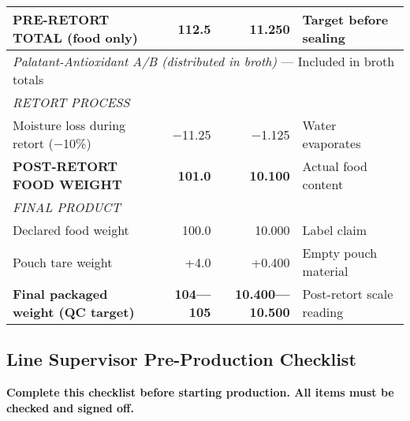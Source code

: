 \begin{table}[h]
\begin{tabular}{@{}lrrl@{}}
\textbf{PRE-RETORT TOTAL (food only)} & \textbf{112.5} & \textbf{11.250} & Target before sealing \\
\midrule
\multicolumn{4}{l}{\textit{Palatant-Antioxidant A/B (distributed in broth)} --- Included in broth totals} \\
\midrule
\multicolumn{4}{l}{\textit{RETORT PROCESS}} \\
Moisture loss during retort ($-$10\%) & $-$11.25 & $-$1.125 & 
Water evaporates \\
\textbf{POST-RETORT FOOD WEIGHT} & \textbf{101.0} & \textbf{10.100} & Actual food content \\
\midrule
\multicolumn{4}{l}{\textit{FINAL PRODUCT}} \\
Declared food weight & 100.0 & 10.000 & Label claim \\
Pouch tare weight & +4.0 & +0.400 & Empty pouch material \\
\textbf{Final packaged weight (QC target)} & \textbf{104---105} & \textbf{10.400---10.500} & Post-retort scale reading \\
\bottomrule
\end{tabular}
\end{table}

\clearpage


\subsection*{Line Supervisor Pre-Production Checklist}

\textbf{Complete this checklist before starting production.
All items must be checked and signed off.}

